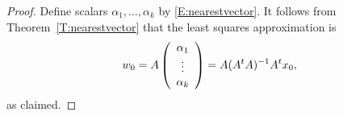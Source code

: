 \documentclass{ximera}
\begin{document}
\begin{proof}
Define scalars $\alpha_1,\ldots,\alpha_k$ by \eqref{E:nearestvector}.  It follows 
from Theorem~\ref{T:nearestvector} that the least squares approximation is
\[ 
w_0 = A \left(\begin{array}{c} \alpha_1 \\ \vdots \\ \alpha_k \end{array}\right) = A(A^tA)^{-1} A^tx_0, 
\]
as claimed.
\end{proof}

\end{document}
